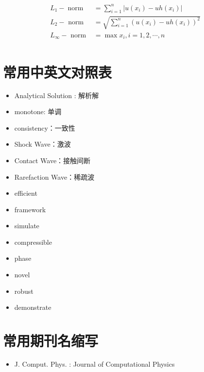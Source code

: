 \documentclass{book}
\begin{document}
\begin{equation}
    \begin{aligned}
        L_{1}-\operatorname{norm} & =\sum_{i=1}^{n}\left|u\left(x_{i}\right)-u h\left(x_{i}\right)\right|            \\
        L_{2}-\text { norm }      & =\sqrt{\sum_{i=1}^{n}\left(u\left(x_{i}\right)-u h\left(x_{i}\right)\right)^{2}} \\
        L_{\infty}-\text { norm } & =\max x_i,i=1,2,\cdots,n                                                         \\
    \end{aligned}
\end{equation}


\section{常用中英文对照表}
\begin{itemize}
    \item Analytical Solution : 解析解
    \item monotone: 单调
    \item consistency：一致性
    \item Shock Wave：激波
    \item Contact Wave：接触间断
    \item Rarefaction Wave：稀疏波
    \item efficient
    \item framework
    \item simulate
    \item compressible
    \item phase
    \item novel
    \item robust
    \item demonstrate
\end{itemize}
\section{常用期刊名缩写}
\begin{itemize}
    \item J. Comput. Phys. : Journal of Computational Physics
\end{itemize}
\end{document}
